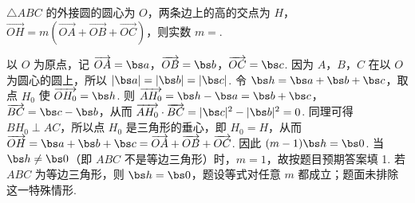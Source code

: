 \begin{problem}
\(\triangle ABC\) 的外接圆的圆心为 \(O\)，两条边上的高的交点为 \(H\)，\(\overrightarrow{OH} = m(\overrightarrow{OA} + \overrightarrow{OB} + \overrightarrow{OC})\)，则实数 \(m =\)\fillinblank{}.

\begin{solution}
以 \(O\) 为原点，记 \(\overrightarrow{OA}=\bs a\)，\(\overrightarrow{OB}=\bs b\)，\(\overrightarrow{OC}=\bs c\). 因为 \(A\)，\(B\)，\(C\) 在以 \(O\) 为圆心的圆上，所以 \(|\bs a|=|\bs b|=|\bs c|\). 令 \(\bs h=\bs a+\bs b+\bs c\)，取点 \(H_0\) 使 \(\overrightarrow{OH_0}=\bs h\). 则
\(\overrightarrow{AH_0}=\bs h-\bs a=\bs b+\bs c\)，\(\overrightarrow{BC}=\bs c-\bs b\)，从而 \(\overrightarrow{AH_0}\cdot\overrightarrow{BC}=|\bs c|^{2}-|\bs b|^{2}=0\). 同理可得 \(BH_0\perp AC\)，所以点 \(H_0\) 是三角形的垂心，即 \(H_0=H\)，从而
\(\overrightarrow{OH}=\bs a+\bs b+\bs c=\overrightarrow{OA}+\overrightarrow{OB}+\overrightarrow{OC}\).
因此 \((m-1)\bs h=\bs0\). 当 \(\bs h\ne\bs0\)（即 \(ABC\) 不是等边三角形）时，\(m=1\)，故按题目预期答案填 1. 若 \(ABC\) 为等边三角形，则 \(\bs h=\bs0\)，题设等式对任意 \(m\) 都成立；题面未排除这一特殊情形.
\end{solution}
\end{problem}

